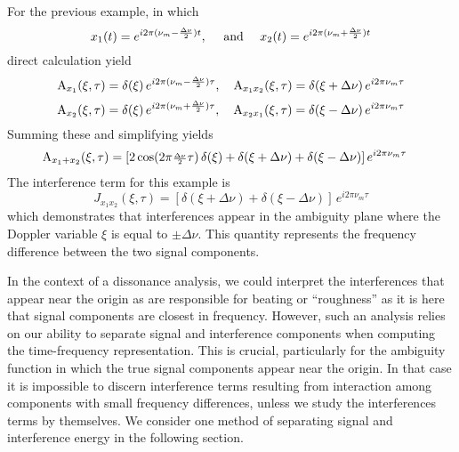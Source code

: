For the previous example, in which 
\[%
x_1(t)%
      =e^{i2\pi(\nu_m-\halfDnu)t},\quad \text{ and } \quad
x_2(t)%
      = e^{i2\pi(\nu_m+\halfDnu)t}
\]%
direct calculation yield
\[%
\A_{x_1}(\xi,\tau)=\delta(\xi)\,e^{i2\pi(\nu_m-\halfDnu)\tau},\quad
\A_{x_1x_2}(\xi,\tau)=\delta(\xi+\Delta\nu)\,e^{i2\pi\nu_m\tau}\]%
\[
\operatorname{A}_{x_2}(\xi,\tau)=\delta(\xi)\,e^{i2\pi(\nu_m+{\scriptstyle \frac{\Delta\nu}{2}})\tau},\quad
\operatorname{A}_{x_2x_1}(\xi,\tau)= \delta(\xi-\Delta\nu)\,e^{i2\pi\nu_m\tau}
\]%
Summing these and simplifying yields
\begin{align*}
\operatorname{A}_{x_1+x_2}(\xi,\tau) 
  &= [2\cos(2\pi{\scriptstyle \frac{\Delta\nu}{2}}\tau)\,\delta(\xi)
   +  \delta(\xi+\Delta\nu)+\delta(\xi-\Delta\nu)]\,e^{i2\pi\nu_m\tau}
\end{align*}
The interference term for this example is
\[
J_{x_1x_2}(\xi,\tau) =    
  [\delta(\xi+\Delta\nu)+\delta(\xi-\Delta\nu)]\,e^{i2\pi\nu_m\tau}
\]
which demonstrates that interferences appear in the ambiguity plane
where the Doppler variable $\xi$ is equal to $\pm\Delta\nu$.  This
quantity represents the frequency difference between the two signal
components.   

In the context of a dissonance analysis, we could interpret the
interferences that appear near the origin as are responsible for beating or
``roughness'' as it is here that signal components are %
closest in frequency.  However, such an analysis relies on our ability
to separate signal and interference components when computing the
time-frequency representation.  This is crucial, particularly for the
ambiguity function in which the true signal components appear
near the origin.  In that case it is impossible to discern
interference terms resulting from interaction among components with
small frequency differences, unless we study the interferences terms
by themselves.  We consider one method of separating signal and
interference energy in the following section.

